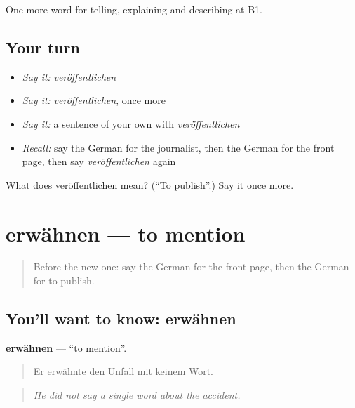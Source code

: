 \begin{grammarlens}[title={What you've built}]
One more word for telling, explaining and describing at B1.
\end{grammarlens}

\subsection*{Your turn}
\begin{itemize}
\raggedright
  \item \emph{Say it:} \emph{veröffentlichen}
  \item \emph{Say it:} \emph{veröffentlichen}, once more
  \item \emph{Say it:} a sentence of your own with \emph{veröffentlichen}
  \item \emph{Recall:} say the German for the journalist, then the German for the front page, then say \emph{veröffentlichen} again
\end{itemize}

\begin{tcolorbox}[breakable,colback=teal!4,colframe=teal!35!black,title={Before you move on}]
What does veröffentlichen mean? (\textquotedblleft{}To publish\textquotedblright{}.) Say it once more.
\end{tcolorbox}
\section[erwähnen]{erwähnen — to mention}

\label{lesson:GE-C273-erwaehnen}



\begin{quote}
Before the new one: say the German for the front page, then the German for to publish.
\end{quote}

\subsection*{You'll want to know: erwähnen}
\textbf{erwähnen} — \textquotedblleft{}to mention\textquotedblright{}.

\begin{quote}
Er erwähnte den Unfall mit keinem Wort.
\end{quote}

\begin{quote}
\emph{He did not say a single word about the accident.}
\end{quote}

